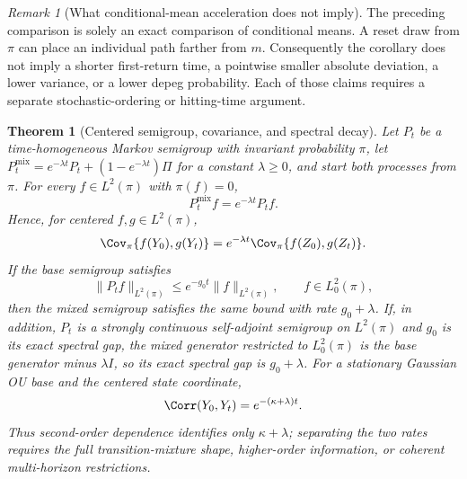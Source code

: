 \documentclass[11pt]{article}
\newtheorem{theorem}[definition]{Theorem}
\theoremstyle{remark}
\newtheorem{remark}[definition]{Remark}
\begin{document}
\begin{remark}[What conditional-mean acceleration does not imply]
The preceding comparison is solely an exact comparison of conditional means.
A reset draw from $\pi$ can place an individual path farther from $m$.
Consequently the corollary does not imply a shorter first-return time, a
pointwise smaller absolute deviation, a lower variance, or a lower depeg
probability.  Each of those claims requires a separate stochastic-ordering or
hitting-time argument.
\end{remark}

\begin{theorem}[Centered semigroup, covariance, and spectral decay]
\label{rev:thm-mixed-spectrum}
Let $P_t$ be a time-homogeneous Markov semigroup with invariant probability
$\pi$, let $P_t^{\mathrm{mix}}=e^{-\lambda t}P_t+
(1-e^{-\lambda t})\Pi$ for a constant $\lambda\geq0$, and start both processes
from $\pi$.  For every $f\in L^2(\pi)$ with $\pi(f)=0$,
\begin{equation}
 P_t^{\mathrm{mix}}f=e^{-\lambda t}P_tf.
 \label{rev:mixed-centered-semigroup}
\end{equation}
Hence, for centered $f,g\in L^2(\pi)$,
\begin{equation}
 \Cov_\pi\{f(Y_0),g(Y_t)\}
 =e^{-\lambda t}\Cov_\pi\{f(Z_0),g(Z_t)\}.
 \label{rev:mixed-centered-covariance}
\end{equation}
If the base semigroup satisfies
\begin{equation}
 \lVert P_tf\rVert_{L^2(\pi)}\leq e^{-g_0t}
 \lVert f\rVert_{L^2(\pi)},\qquad f\in L_0^2(\pi),
 \label{rev:base-L2-decay}
\end{equation}
then the mixed semigroup satisfies the same bound with rate $g_0+\lambda$.
If, in addition, $P_t$ is a strongly continuous self-adjoint semigroup on
$L^2(\pi)$ and $g_0$ is its exact spectral gap, the mixed generator restricted
to $L_0^2(\pi)$ is the base generator minus $\lambda I$, so its exact spectral
gap is $g_0+\lambda$.  For a stationary Gaussian OU base and the centered state
coordinate,
\begin{equation}
 \Corr(Y_0,Y_t)=e^{-(\kappa+\lambda)t}.
 \label{rev:mixed-OU-correlation}
\end{equation}
Thus second-order dependence identifies only $\kappa+\lambda$; separating the
two rates requires the full transition-mixture shape, higher-order
information, or coherent multi-horizon restrictions.
\end{theorem}
\end{document}
